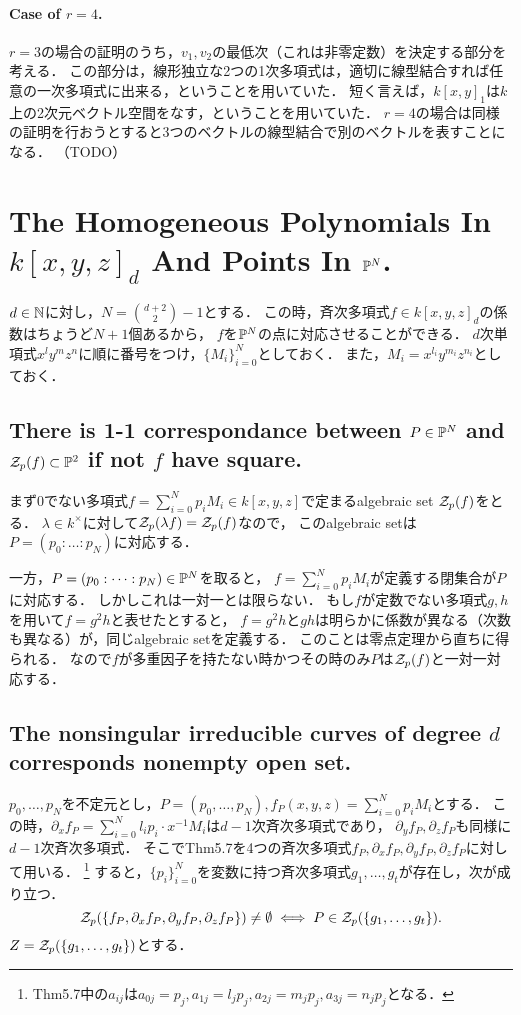 \documentclass[a4paper]{jsarticle}
\begin{document}
    \paragraph{Case of $r=4$.}
    $r=3$の場合の証明のうち，$v_1, v_2$の最低次（これは非零定数）を決定する部分を考える．
    この部分は，線形独立な2つの1次多項式は，適切に線型結合すれば任意の一次多項式に出来る，ということを用いていた．
    短く言えば，$k[x,y]_1$は$k$上の2次元ベクトル空間をなす，ということを用いていた．
    $r=4$の場合は同様の証明を行おうとすると3つのベクトルの線型結合で別のベクトルを表すことになる．
    （TODO）

\section{The Homogeneous Polynomials In $k[x,y,z]_d$ And Points In $\mathbb{P}^N$.} %
    $d \in \mathbb{N}$に対し，$N=\binom{d+2}{2}-1$とする．
    この時，斉次多項式$f \in k[x,y,z]_d$の係数はちょうど$N+1$個あるから，
    $f$を$\mathbb{P}^N$の点に対応させることができる．
    $d$次単項式$x^l y^m z^n$に順に番号をつけ，$\{M_i\}_{i=0}^{N}$としておく．
    また，$M_i=x^{l_i} y^{m_i} z^{n_i}$としておく．

    \subsection{There is 1-1 correspondance between $P \in \mathbb{P}^N$ and $\mathcal{Z}_p(f) \subset \mathbb{P}^2$ if not $f$ have square.}
    まず0でない多項式$f=\sum_{i=0}^{N}p_i M_i \in k[x,y,z]$で定まるalgebraic set $\mathcal{Z}_p(f)$をとる．
    $\lambda \in k^{\times}$に対して$\mathcal{Z}_p(\lambda f)=\mathcal{Z}_p(f)$なので，
    このalgebraic setは$P=(p_0:\dots:p_N)$に対応する．

    一方，$P=(p_0:\dots:p_N) \in \mathbb{P}^N$を取ると，
    $f=\sum_{i=0}^{N}p_i M_i$が定義する閉集合が$P$に対応する．
    しかしこれは一対一とは限らない．
    もし$f$が定数でない多項式$g,h$を用いて$f=g^2 h$と表せたとすると，
    $f=g^2 h$と$gh$は明らかに係数が異なる（次数も異なる）が，同じalgebraic setを定義する．
    このことは零点定理から直ちに得られる．
    なので$f$が多重因子を持たない時かつその時のみ$P$は$\mathcal{Z}_p(f)$と一対一対応する．

    \subsection{The nonsingular irreducible curves of degree $d$ corresponds nonempty open set.}
    $p_0,\dots,p_N$を不定元とし，$P=(p_0,\dots,p_N), f_P(x,y,z)=\sum_{i=0}^{N}p_i M_i$とする．
    この時，$\partial_x f_P=\sum_{i=0}^{N} l_i p_i \cdot x^{-1} M_i$は$d-1$次斉次多項式であり，
    $\partial_y f_P, \partial_z f_P$も同様に$d-1$次斉次多項式．
    そこでThm5.7を4つの斉次多項式$f_P, \partial_x f_P, \partial_y f_P, \partial_z f_P$に対して用いる．
    \footnote{Thm5.7中の$a_{ij}$は$a_{0j}=p_j, a_{1j}=l_j p_j, a_{2j}=m_j p_j,a_{3j}=n_j p_j$となる．}
    すると，$\{p_i\}_{i=0}^N$を変数に持つ斉次多項式$g_1,\dots,g_t$が存在し，次が成り立つ．
    \[ \mathcal{Z}_p(\{f_P, \partial_x f_P, \partial_y f_P, \partial_z f_P\}) \neq \emptyset \iff P \in \mathcal{Z}_p(\{g_1,\dots,g_t\}). \]
    $Z=\mathcal{Z}_p(\{g_1,\dots,g_t\})$とする．
\end{document}
